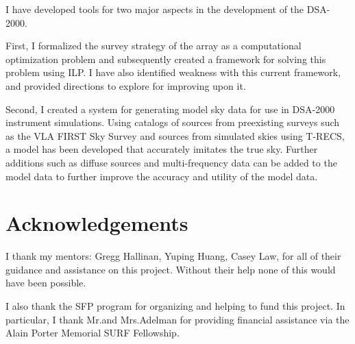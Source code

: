 \documentclass{article}
\begin{document}
\begin{multicols*}{2}
I have developed tools for two major aspects in the development of the DSA-2000. 

First, I formalized the survey strategy of the array as a computational optimization problem and subsequently created a framework for solving this problem using ILP. I have also identified weakness with this current framework, and provided directions to explore for improving upon it. 

Second, I created a system for generating model sky data for use in DSA-2000 instrument simulations. Using catalogs of sources from preexisting surveys such as the VLA FIRST Sky Survey and sources from simulated skies using T-RECS, a model has been developed that accurately imitates the true sky. Further additions such as diffuse sources and multi-frequency data can be added to the model data to further improve the accuracy and utility of the model data.


\section*{Acknowledgements}

I thank my mentors: Gregg Hallinan, Yuping Huang, Casey Law, for all of their guidance and assistance on this project. Without their help none of this would have been possible.

I also thank the SFP program for organizing and helping to fund this project. In particular, I thank Mr.\@ and Mrs.\@ Adelman for providing financial assistance via the Alain Porter Memorial SURF Fellowship. 




\end{multicols*}
\end{document}
